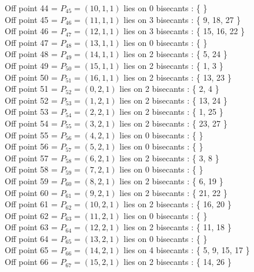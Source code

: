 \documentclass{article}
\begin{document}
{Off point 44 = $P_{45} = ( 10, 1, 1 )$ lies on 0 bisecants : \{  \}\\
Off point 45 = $P_{46} = ( 11, 1, 1 )$ lies on 3 bisecants : \{ 9, 18, 27 \}\\
Off point 46 = $P_{47} = ( 12, 1, 1 )$ lies on 3 bisecants : \{ 15, 16, 22 \}\\
Off point 47 = $P_{48} = ( 13, 1, 1 )$ lies on 0 bisecants : \{  \}\\
Off point 48 = $P_{49} = ( 14, 1, 1 )$ lies on 2 bisecants : \{ 5, 24 \}\\
Off point 49 = $P_{50} = ( 15, 1, 1 )$ lies on 2 bisecants : \{ 1, 3 \}\\
Off point 50 = $P_{51} = ( 16, 1, 1 )$ lies on 2 bisecants : \{ 13, 23 \}\\
Off point 51 = $P_{52} = ( 0, 2, 1 )$ lies on 2 bisecants : \{ 2, 4 \}\\
Off point 52 = $P_{53} = ( 1, 2, 1 )$ lies on 2 bisecants : \{ 13, 24 \}\\
Off point 53 = $P_{54} = ( 2, 2, 1 )$ lies on 2 bisecants : \{ 1, 25 \}\\
Off point 54 = $P_{55} = ( 3, 2, 1 )$ lies on 2 bisecants : \{ 23, 27 \}\\
Off point 55 = $P_{56} = ( 4, 2, 1 )$ lies on 0 bisecants : \{  \}\\
Off point 56 = $P_{57} = ( 5, 2, 1 )$ lies on 0 bisecants : \{  \}\\
Off point 57 = $P_{58} = ( 6, 2, 1 )$ lies on 2 bisecants : \{ 3, 8 \}\\
Off point 58 = $P_{59} = ( 7, 2, 1 )$ lies on 0 bisecants : \{  \}\\
Off point 59 = $P_{60} = ( 8, 2, 1 )$ lies on 2 bisecants : \{ 6, 19 \}\\
Off point 60 = $P_{61} = ( 9, 2, 1 )$ lies on 2 bisecants : \{ 21, 22 \}\\
Off point 61 = $P_{62} = ( 10, 2, 1 )$ lies on 2 bisecants : \{ 16, 20 \}\\
Off point 62 = $P_{63} = ( 11, 2, 1 )$ lies on 0 bisecants : \{  \}\\
Off point 63 = $P_{64} = ( 12, 2, 1 )$ lies on 2 bisecants : \{ 11, 18 \}\\
Off point 64 = $P_{65} = ( 13, 2, 1 )$ lies on 0 bisecants : \{  \}\\
Off point 65 = $P_{66} = ( 14, 2, 1 )$ lies on 4 bisecants : \{ 5, 9, 15, 17 \}\\
Off point 66 = $P_{67} = ( 15, 2, 1 )$ lies on 2 bisecants : \{ 14, 26 \}\\
}
\end{document}
